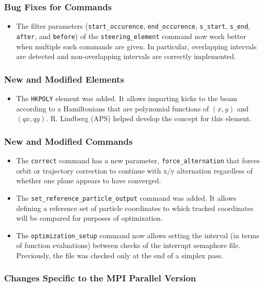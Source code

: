 \documentclass[11pt]{article}
\begin{document}
\subsubsection{Bug Fixes for Commands}
\begin{itemize}
\item The filter parameters (\verb|start_occurence|, \verb|end_occurence|, \verb|s_start|, \verb|s_end|, 
  \verb|after|, and \verb|before|)  of the \verb|steering_element| command now work better when multiple
  such commands are given. In particular, overlapping intervals are detected and non-overlapping intervals
  are correctly implemented.
\end{itemize}

\subsubsection{New and Modified Elements}
\begin{itemize}
\item The \verb|HKPOLY| element was added. It allows imparting kicks to the beam according to 
  a Hamiltonians that are polynomial functions of $(x, y)$ and $(qx, qy)$. R. Lindberg (APS) helped develop the
  concept for this element.
\end{itemize}

\subsubsection{New and Modified Commands}
\begin{itemize}
\item The \verb|correct| command has a new parameter, \verb|force_alternation| that forces orbit or trajectory correction
  to continue with x/y alternation regardless of whether one plane appears to have converged.
\item The \verb|set_reference_particle_output| command was added. It allows defining a reference set of particle coordinates
  to which tracked coordinates will be compared for purposes of optimization.
\item The \verb|optimization_setup| command now allows setting the interval (in terms of function evaluations) 
  between checks of the interrupt semaphore file. Previously, the file was checked only at the end of a simplex pass.
\end{itemize}

\subsubsection{Changes Specific to the MPI Parallel Version}
\end{document}

